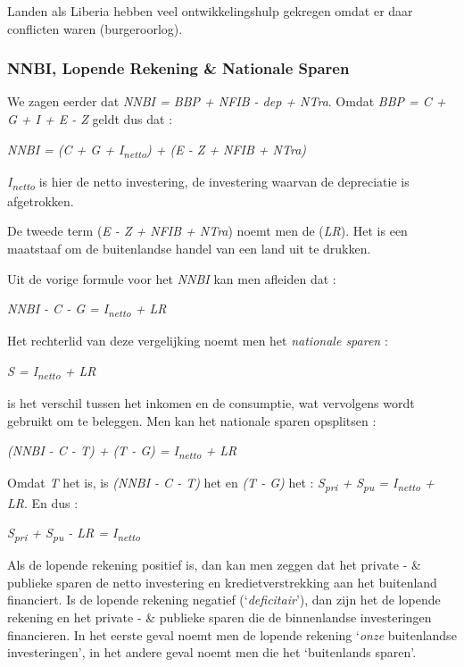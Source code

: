 Landen als Liberia hebben veel ontwikkelingshulp gekregen omdat er daar conflicten waren (burgeroorlog).

\subsubsection{NNBI, Lopende Rekening \& Nationale Sparen}

We zagen eerder dat \textit{NNBI = BBP + NFIB - dep + NTra}. Omdat \textit{BBP = C + G + I + E - Z} geldt dus dat :
\begin{leftbar}
\textit{NNBI = (C + G + I\textsubscript{netto}) + (E - Z + NFIB + NTra)}
\end{leftbar}
\noindent\textit{I\textsubscript{netto}} is hier de netto investering, de investering waarvan de depreciatie is afgetrokken.
\par De tweede term (\textit{E - Z + NFIB + NTra}) noemt men de  (\textit{LR}). Het is een maatstaaf om de buitenlandse handel van een land uit te drukken. \\

\par Uit de vorige formule voor het \textit{NNBI} kan men afleiden dat :
\begin{leftbar}
\textit{NNBI - C - G = I\textsubscript{netto} + LR}
\end{leftbar}
Het rechterlid van deze vergelijking noemt men het \textit{nationale sparen} :
\begin{leftbar}
\textit{S = I\textsubscript{netto} + LR}
\end{leftbar}
 is het verschil tussen het inkomen en de consumptie, wat vervolgens wordt gebruikt om te beleggen. Men kan het nationale sparen opsplitsen :
\begin{leftbar}
\textit{(NNBI - C - T) + (T - G) = I\textsubscript{netto} + LR}
\end{leftbar}
Omdat \textit{T} het  is, is \textit{(NNBI - C - T)} het  en \textit{(T - G)} het  : \textit{S\textsubscript{pri} + S\textsubscript{pu} = I\textsubscript{netto} + LR}. En dus :
\begin{leftbar}
\textit{S\textsubscript{pri} + S\textsubscript{pu} - LR = I\textsubscript{netto}}
\end{leftbar}
Als de lopende rekening positief is, dan kan men zeggen dat het private - \& publieke sparen de netto investering en kredietverstrekking aan het buitenland financiert. Is de lopende rekening negatief (`\textit{deficitair}'), dan zijn het de lopende rekening en het private - \& publieke sparen die de binnenlandse investeringen financieren. In het eerste geval noemt men de lopende rekening `\textit{onze} buitenlandse investeringen', in het andere geval noemt men die het `buitenlands sparen'.\\

